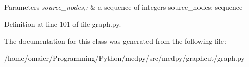 \begin{DoxyParams}{Parameters}
{\em source\_\-nodes,:} & a sequence of integers  source\_\-nodes: sequence \\
\hline
\end{DoxyParams}


Definition at line 101 of file graph.py.



The documentation for this class was generated from the following file:\begin{DoxyCompactItemize}
\item 
/home/omaier/Programming/Python/medpy/src/medpy/graphcut/graph.py\end{DoxyCompactItemize}
